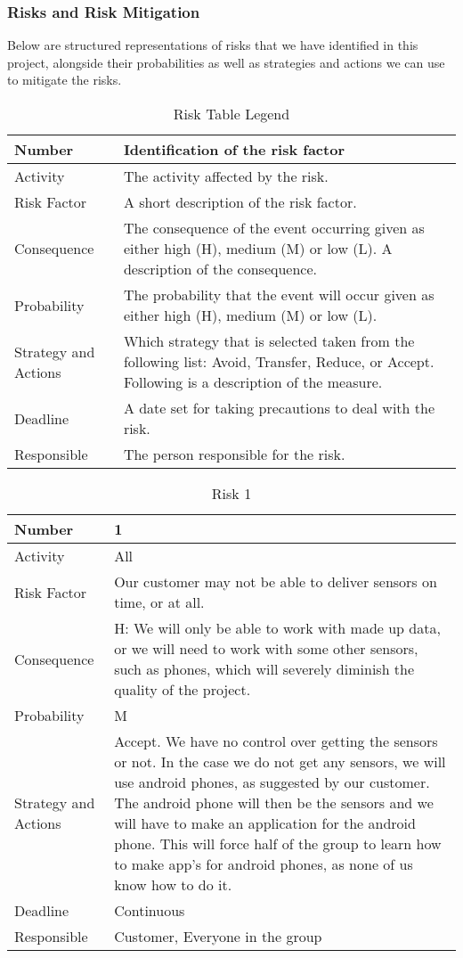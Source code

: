 \documentclass[../document.tex]{subfiles}
\begin{document}
\subsubsection{Risks and Risk Mitigation}
\label{risks_and_risk_mitigation}
Below are structured representations of risks that we have identified in this project, alongside their probabilities as well as strategies and actions we can use to mitigate the risks.

\begin{table}[H]
\caption{Risk Table Legend}
\begin{tabularx}{\textwidth}{|l|X|}
\hline
Number
&Identification of the risk factor
\\ \hline Activity
&The activity affected by the risk.
\\ \hline Risk Factor
&A short description of the risk factor.
\\ \hline Consequence
&The consequence of the event occurring given as either high (H), medium (M) or low (L). A description of the consequence.
\\ \hline Probability
&The probability that the event will occur given as either high (H), medium (M) or low (L).
\\ \hline Strategy and Actions
&Which strategy that is selected taken from the following list: Avoid, Transfer, Reduce, or Accept. Following is a description of the measure.
\\ \hline Deadline
&A date set for taking precautions to deal with the risk.
\\ \hline Responsible
&The person responsible for the risk.
\\ \hline
\end{tabularx}
\end{table}

\begin{table}[H]
\caption{Risk 1}
\begin{tabularx}{\textwidth}{|l|X|}
\hline
Number
&1
\\ \hline Activity
&All
\\ \hline Risk Factor
&Our customer may not be able to deliver sensors on time, or at all.
\\ \hline Consequence
&H: We will only be able to work with made up data, or we will need to work with some other sensors, such as phones, which will severely diminish the quality of the project.
\\ \hline Probability
&M
\\ \hline Strategy and Actions
&Accept. We have no control over getting the sensors or not. In the case we do not get any sensors, we will use android phones, as suggested by our customer. The android phone will then be the sensors and we will have to make an application for the android phone. This will force half of the group to learn how to make app’s for android phones, as none of us know how to do it.
\\ \hline Deadline
&Continuous
\\ \hline Responsible
&Customer, Everyone in the group
\\ \hline 
\end{tabularx}
\end{table}
\end{document}
